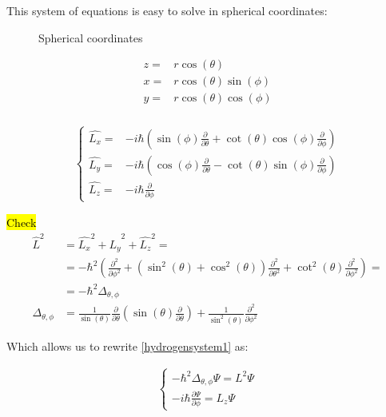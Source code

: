	This system of equations is easy to solve in spherical coordinates:
	\begin{figure}[!h]
		\centering
		
		\caption{Spherical coordinates}
	\end{figure}
	
	\begin{align}
		z =& r \cos(\theta) \\ 
		x =& r \cos(\theta)\sin(\phi) \\ 
		y =& r \cos(\theta)\cos(\phi) \\ 								
	\end{align}
	
	\begin{align}
		\left\{ \begin{aligned}
			\hat{L_x} =& - i\hbar \left(\sin(\phi)\frac{\partial}{\partial \theta} + \cot(\theta)\cos(\phi)\frac{\partial}{\partial \phi}\right) \\
			\hat{L_y} =& - i\hbar \left(\cos(\phi)\frac{\partial}{\partial \theta} - \cot(\theta)\sin(\phi)\frac{\partial}{\partial \phi}\right) \\
			\hat{L_z} =& - i\hbar \frac{\partial}{\partial \phi}
		\end{aligned} \right.
	\end{align}
	
	\hl{Check}
	\begin{align}
		\hat{L}^2 	&= \hat{L_x}^2 + \hat{L_y}^2 + \hat{L_z}^2 = \\
		&= -\hbar^2 \left( \frac{\partial^2}{\partial \phi^2} + \left(\sin^2(\theta) + \cos^2(\theta) \right)\frac{\partial^2}{\partial \theta^2} + \cot^2(\theta) \frac{\partial^2}{\partial \phi^2} \right) = \\
		&= -\hbar^2 \Delta_{\theta, \phi} \\
		\Delta_{\theta, \phi} &= \frac{1}{\sin (\theta)}\frac{\partial}{\partial \theta}\left(\sin(\theta)\frac{\partial}{\partial \theta}\right) + \frac{1}{\sin^2(\theta)}\frac{\partial^2}{\partial \phi ^2}
	\end{align}
	
	Which allows us to rewrite \ref{hydrogensystem1} as:
	
	\begin{align}
		\left\{ \begin{aligned}
			-\hbar^2 \Delta_{\theta, \phi} \Psi = L^2 \Psi \\
			-i\hbar \frac{\partial \Psi}{\partial \phi} = L_z \Psi
		\end{aligned} \right.				
	\end{align}
	
